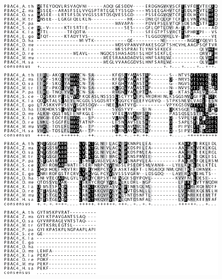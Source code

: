 \begin{figure}[ht]
	\centering
	\includegraphics[width=\columnwidth]{Proteasome/pbac4align1.png}
	{}
	\label{fig:pbac4align}
\end{figure}

